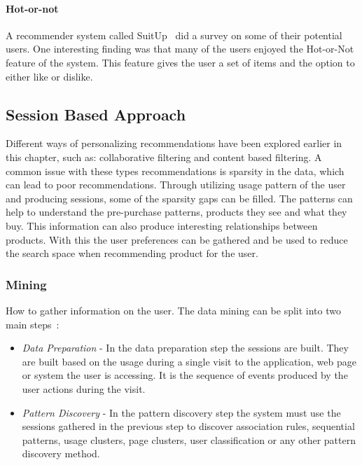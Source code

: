\paragraph{Hot-or-not}
A recommender system called SuitUp~\cite{SuitUp} did a survey on some of their potential users.
One interesting finding was that many of the users enjoyed the Hot-or-Not feature of the system.
This feature gives the user a set of items and the option to either like or dislike.

\subsection{Session Based Approach}
    Different ways of personalizing recommendations have been explored earlier in this chapter, such as: collaborative filtering and content based filtering.
    A common issue with these types recommendations is sparsity in the data, which can lead to poor recommendations.
    Through utilizing usage pattern of the user and producing sessions, some of the sparsity gaps can be filled.
    The patterns can help to understand the pre-purchase patterns, products they see and what they buy.
    This information can also produce interesting relationships between products.
    With this the user preferences can be gathered and be used to reduce the search space when recommending product for the user.


\subsubsection{Mining}
    How to gather information on the user.
    The data mining can be split into two main steps~\cite{Cho2002329}:
    \begin{itemize}
        \item \emph{Data Preparation} - In the data preparation step the sessions are built. They are built based on the usage during a single visit to the application, web page or system the user is accessing. It is the sequence of events produced by the user actions during the visit.
        \item \emph{Pattern Discovery} - In the pattern discovery step the system must use the sessions gathered in the previous step to discover association rules, sequential patterns, usage clusters, page clusters, user classification or any other pattern discovery method.
    \end{itemize}


